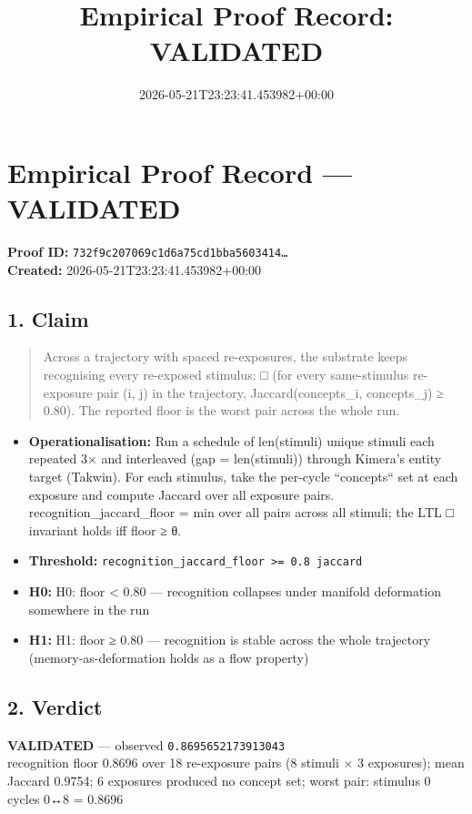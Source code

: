 \documentclass{article}
\title{Empirical Proof Record: VALIDATED}
\date{2026-05-21T23:23:41.453982+00:00}
\begin{document}
\maketitle
\section*{Empirical Proof Record --- \textcolor{validated}{\textbf{VALIDATED}}}
\textbf{Proof ID:} \texttt{732f9c207069c1d6a75cd1bba5603414\dots}\\
\textbf{Created:} 2026-05-21T23:23:41.453982+00:00
\subsection*{1. Claim}
\begin{quote}Across a trajectory with spaced re-exposures, the substrate keeps recognising every re-exposed stimulus: □ (for every same-stimulus re-exposure pair (i, j) in the trajectory, Jaccard(concepts\_i, concepts\_j) ≥ 0.80). The reported floor is the worst pair across the whole run.\end{quote}
\begin{itemize}
\item \textbf{Operationalisation:} Run a schedule of len(stimuli) unique stimuli each repeated 3× and interleaved (gap = len(stimuli)) through Kimera's entity target (Takwin). For each stimulus, take the per-cycle ``concepts`` set at each exposure and compute Jaccard over all exposure pairs. recognition\_jaccard\_floor = min over all pairs across all stimuli; the LTL □ invariant holds iff floor ≥ θ.
\item \textbf{Threshold:} \texttt{recognition\_jaccard\_floor >= 0.8 jaccard}
\item \textbf{H0:} H0: floor < 0.80 — recognition collapses under manifold deformation somewhere in the run
\item \textbf{H1:} H1: floor ≥ 0.80 — recognition is stable across the whole trajectory (memory-as-deformation holds as a flow property)
\end{itemize}
\subsection*{2. Verdict}
\textcolor{validated}{\textbf{VALIDATED}} --- observed \texttt{0.8695652173913043}\\
recognition floor 0.8696 over 18 re-exposure pairs (8 stimuli × 3 exposures); mean Jaccard 0.9754; 6 exposures produced no concept set; worst pair: stimulus 0 cycles 0↔8 = 0.8696
\end{document}
